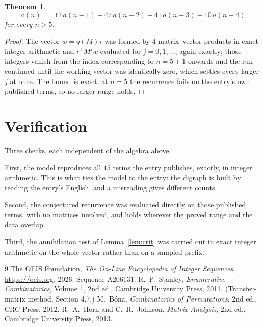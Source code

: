 \documentclass[11pt,a4paper]{article}
\theoremstyle{plain}
\newtheorem{theorem}{Theorem}
\theoremstyle{definition}
\begin{document}
\begin{theorem}
\[
a(n)\;=\;17\,a(n-1) - 47\,a(n-2) + 41\,a(n-3) - 10\,a(n-4)
\]
for every $n>5$.
\end{theorem}

\begin{proof}
The vector $w=q(M)\tau$ was formed by $4$ matrix--vector products in exact integer
arithmetic and $\iota^{\!\top}M^{j}w$ evaluated for $j=0,1,\dots$, again exactly; those
integers vanish from the index corresponding to $n=5+1$ onwards and the run continued
until the working vector was identically zero, which settles every larger $j$ at once. The bound is exact: at $n=5$ the recurrence fails on the entry's own published terms, so no larger range holds.
\end{proof}

\section{Verification}

Three checks, each independent of the algebra above.

First, the model reproduces all $15$ terms the entry publishes, exactly, in integer
arithmetic. This is what ties the model to the entry: the digraph is built by reading the
entry's English, and a misreading gives different counts.

Second, the conjectured recurrence was evaluated directly on those published terms, with no
matrices involved, and holds wherever the proved range and the data overlap.

Third, the annihilation test of Lemma~\ref{lem:crit} was carried out in exact integer
arithmetic on the whole vector rather than on a sampled prefix.

\begin{thebibliography}{9}
 The OEIS Foundation, \emph{The On-Line Encyclopedia of Integer
Sequences}, \url{https://oeis.org}, 2026. Sequence A206131.
 R.~P.~Stanley, \emph{Enumerative Combinatorics}, Volume 1, 2nd ed.,
Cambridge University Press, 2011. (Transfer-matrix method, Section 4.7.)
 M.~B\'ona, \emph{Combinatorics of Permutations}, 2nd ed., CRC
Press, 2012.
 R.~A.~Horn and C.~R.~Johnson, \emph{Matrix Analysis}, 2nd ed., Cambridge
University Press, 2013.
\end{thebibliography}
\end{document}
